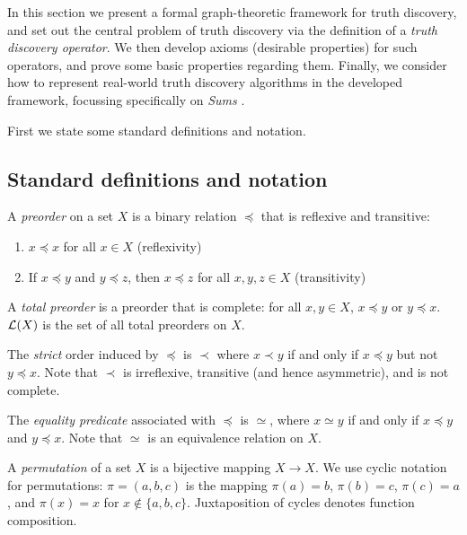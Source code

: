 \documentclass[../main.tex]{subfiles}
\begin{document}
In this section we present a formal graph-theoretic framework for truth
discovery, and set out the central problem of truth discovery via the
definition of a \emph{truth discovery operator}. We then develop axioms
(desirable properties) for such operators, and prove some basic properties
regarding them. Finally, we consider how to represent real-world truth
discovery algorithms in the developed framework, focussing specifically on
\emph{Sums} \cite{pasternack}.

First we state some standard definitions and notation.

\subsection{Standard definitions and notation}

\begin{definition}
A \emph{preorder} on a set $X$ is a binary relation $\preceq$ that is reflexive
and transitive:
\begin{enumerate}
\item $x \preceq x$ for all $x \in X$ (reflexivity)
\item If $x \preceq y$ and $y \preceq z$, then $x \preceq z$ for all $x, y, z
\in X$ (transitivity)
\end{enumerate}

A \emph{total preorder} is a preorder that is complete: for all $x, y \in X$,
$x \preceq y$ or $y \preceq x$. $\mathcal{L}(X)$ is the set of all total
preorders on $X$.

The \emph{strict} order induced by $\preceq$ is $\prec$ where $x \prec y$ if
and only if $x \preceq y$ but not $y \preceq x$. Note that $\prec$ is
irreflexive, transitive (and hence asymmetric), and is not complete.

The \emph{equality predicate} associated with $\preceq$ is $\simeq$, where $x
\simeq y$ if and only if $x \preceq y$ and $y \preceq x$. Note that $\simeq$ is
an equivalence relation on $X$.

\end{definition}

\begin{definition}
A \emph{permutation} of a set $X$ is a bijective mapping $X \rightarrow X$. We
use cyclic notation for permutations: $\pi=(a, b, c)$ is the mapping $\pi(a) =
b$, $\pi(b) = c$, $\pi(c) = a$, and $\pi(x) = x$ for $x \notin \{a, b, c\}$.
Juxtaposition of cycles denotes function composition.
\end{definition}
\end{document}

